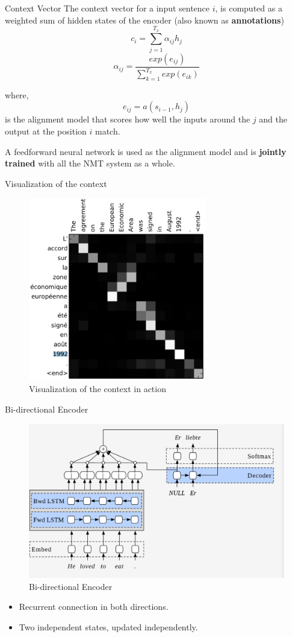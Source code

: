 ﻿\documentclass[table,aspectratio=43,mathserif,xcolor={usenames,dvipsnames,svgnames,table},10pt]{beamer}
\begin{document}
\begin{frame}{Context Vector}
  The context vector for a input sentence $i$, is computed as a weighted sum of hidden states of the encoder (also known as \textbf{annotations})
  $$ c_i = \sum_{j=1}^{T_{x}} \alpha_{ij} h_j$$
  $$ \alpha_{ij} = \frac{ exp(e_{ij})}{ \sum_{k=1}^{T_x} exp (e_{ik})}$$

where,
$$ e_{ij} = a(s_{i-1}, h_j)  $$ is the alignment model that scores how well the inputs around the $j$ and the output at the position $i$ match.

A feedforward neural network is used as the alignment model and is \textbf{jointly trained} with all the NMT system as a whole.
\end{frame}

\begin{frame}{Visualization of the context}
 \begin{figure}[h]
    \includegraphics[height=8cm]{images/contextres.png}  
    \caption{Visualization of the context in action}
  \end{figure}
\end{frame}

\begin{frame}{Bi-directional Encoder}
 
 \begin{figure}[h]
    \includegraphics[width=0.9\linewidth]{images/birnn.png}  
    \caption{Bi-directional Encoder}
  \end{figure}
  \begin{itemize}
   \item<+-> Recurrent connection in both directions.
   \item<+-> Two independent states, updated independently.
  \end{itemize}
\end{frame}
\end{document}
